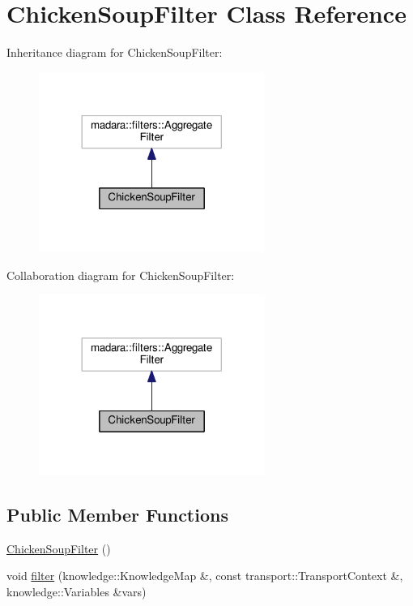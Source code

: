 \hypertarget{classChickenSoupFilter}{}\section{Chicken\+Soup\+Filter Class Reference}
\label{classChickenSoupFilter}


Inheritance diagram for Chicken\+Soup\+Filter\+:\nopagebreak
\begin{figure}[H]
\begin{center}
\leavevmode
\includegraphics[width=209pt]{d2/d51/classChickenSoupFilter__inherit__graph}
\end{center}
\end{figure}


Collaboration diagram for Chicken\+Soup\+Filter\+:\nopagebreak
\begin{figure}[H]
\begin{center}
\leavevmode
\includegraphics[width=209pt]{d9/da2/classChickenSoupFilter__coll__graph}
\end{center}
\end{figure}
\subsection*{Public Member Functions}
\begin{DoxyCompactItemize}
\item 
\hyperlink{classChickenSoupFilter_aa9e30dad395da66f36ff7e5ae041bf74}{Chicken\+Soup\+Filter} ()
\item 
void \hyperlink{classChickenSoupFilter_a7395f85e902c19e6fbb43b17087c8075}{filter} (knowledge\+::\+Knowledge\+Map \&, const transport\+::\+Transport\+Context \&, knowledge\+::\+Variables \&vars)
\end{DoxyCompactItemize}
